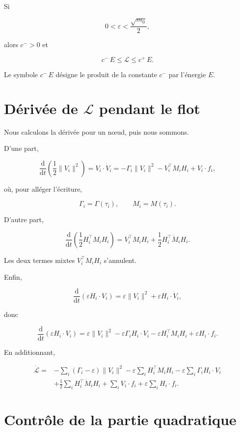 Si

\[
0<\varepsilon<\frac{\sqrt{m_0}}{2},
\]

alors \(c^{-}>0\) et

\[
\boxed{
c^{-}\,E
\leq
\mathcal L
\leq
c^{+}\,E
}.
\]

Le symbole \(c^{-}\,E\) désigne le produit de la constante \(c^{-}\) par
l'énergie \(E\).

\section{Dérivée de \texorpdfstring{$\mathcal L$}{L} pendant le flot}
\label{annexe-energie-derivee-flot}

Nous calculons la dérivée pour un nœud, puis nous sommons.

D'une part,

\[
\frac{\mathrm d}{\mathrm dt}
\left(\frac12\|V_i\|^2\right)
=
V_i\cdot\dot V_i
=
-\Gamma_i\|V_i\|^2
-
V_i^\top M_iH_i
+
V_i\cdot f_i,
\]

où, pour alléger l'écriture,

\[
\Gamma_i=\Gamma(\tau_i),
\qquad
M_i=M(\tau_i).
\]

D'autre part,

\[
\frac{\mathrm d}{\mathrm dt}
\left(
\frac12H_i^\top M_iH_i
\right)
=
V_i^\top M_iH_i
+
\frac12H_i^\top\dot M_iH_i.
\]

Les deux termes mixtes \(V_i^\top M_iH_i\) s'annulent.

Enfin,

\[
\frac{\mathrm d}{\mathrm dt}
\left(
\varepsilon H_i\cdot V_i
\right)
=
\varepsilon\|V_i\|^2
+
\varepsilon H_i\cdot\dot V_i,
\]

donc

\[
\frac{\mathrm d}{\mathrm dt}
\left(
\varepsilon H_i\cdot V_i
\right)
=
\varepsilon\|V_i\|^2
-
\varepsilon\Gamma_iH_i\cdot V_i
-
\varepsilon H_i^\top M_iH_i
+
\varepsilon H_i\cdot f_i.
\]

En additionnant,

\[
\begin{aligned}
\dot{\mathcal L}
={}&
-\sum_i(\Gamma_i-\varepsilon)\|V_i\|^2
-\varepsilon\sum_iH_i^\top M_iH_i
-\varepsilon\sum_i\Gamma_iH_i\cdot V_i
\\
&+
\frac12\sum_iH_i^\top\dot M_iH_i
+
\sum_iV_i\cdot f_i
+
\varepsilon\sum_iH_i\cdot f_i.
\end{aligned}
\]

\section{Contrôle de la partie quadratique}
\label{annexe-energie-partie-quadratique}

